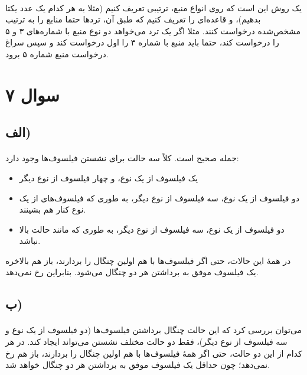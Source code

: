 \documentclass{article}
\begin{document}
	\paragraph*{}
	یک روش این است که روی انواع منبع، ترتیبی تعریف کنیم (مثلا به هر کدام یک عدد یکتا بدهیم)، و قاعده‌ای را تعریف کنیم که طبق آن، تردها حتما منابع را به ترتیب مشخص‌شده درخواست کنند. مثلا اگر یک ترد می‌خواهد دو نوع منبع با شماره‌های ۳ و ۵ را درخواست کند، حتما باید منبع با شماره ۳ را اول درخواست کند و سپس سراغ درخواست منبع شماره ۵ برود.

	\section*{سوال ۷}
	\subsection*{الف)}
	\paragraph*{}
	جمله صحیح است. کلاً سه حالت برای نشستن فیلسوف‌ها وجود دارد:

	\begin{itemize}
		\item
		یک فیلسوف از یک نوع، و چهار فیلسوف از نوع دیگر
		\item
		دو فیلسوف از یک نوع، سه فیلسوف از نوع دیگر، به طوری که فیلسوف‌های از یک نوع کنار هم بشینند.

		\item
		دو فیلسوف از یک نوع، سه فیلسوف از نوع دیگر، به طوری که مانند حالت بالا نباشد.
	\end{itemize}

	در همهٔ این حالات، حتی اگر فیلسوف‌ها با هم اولین چنگال را بردارند، باز هم بالاخره یک فیلسوف موفق به برداشتن هر دو چنگال می‌شود. بنابراین
	رخ نمی‌دهد.

	\subsection*{ب)}
	\paragraph*{}
	می‌توان بررسی کرد که این حالت چنگال برداشتن فیلسوف‌ها (دو فیلسوف از یک نوع و سه فیلسوف از نوع دیگر)، فقط دو حالت مختلف نشستن می‌تواند ایجاد کند. در هر کدام از این دو حالت، حتی اگر همهٔ فیلسوف‌ها با هم اولین چنگال را بردارند، باز هم
	رخ نمی‌دهد؛ چون حداقل یک فیلسوف موفق به برداشتن هر دو چنگال خواهد شد.
\end{document}
